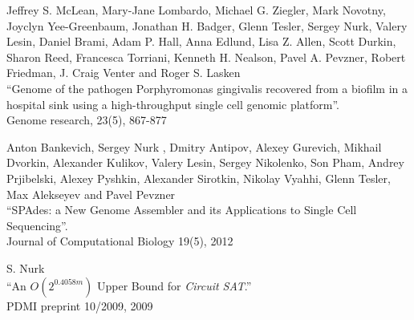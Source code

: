 \begin{innerlist}
\blankline

\item Jeffrey S. McLean, Mary-Jane Lombardo, Michael G. Ziegler, Mark Novotny, Joyclyn Yee-Greenbaum, Jonathan H. Badger, Glenn Tesler, Sergey Nurk, Valery Lesin, Daniel Brami, Adam P. Hall, Anna Edlund, Lisa Z. Allen, Scott Durkin, Sharon Reed, Francesca Torriani, Kenneth H. Nealson, Pavel A. Pevzner, Robert Friedman, J. Craig Venter and Roger S. Lasken \\
``Genome of the pathogen Porphyromonas gingivalis recovered from a biofilm in a hospital sink using a high-throughput single cell genomic platform''. \\
Genome research, 23(5), 867-877

\blankline

\item Anton Bankevich, Sergey Nurk %
, Dmitry Antipov, Alexey Gurevich, Mikhail Dvorkin, Alexander Kulikov, Valery Lesin, Sergey Nikolenko, Son Pham, Andrey Prjibelski, Alexey Pyshkin, Alexander Sirotkin, Nikolay Vyahhi, Glenn Tesler, Max Alekseyev and Pavel Pevzner\\
``SPAdes: a New Genome Assembler and its Applications to Single Cell Sequencing''.\\
Journal of Computational Biology 19(5), 2012

\blankline

\item S. Nurk\\
``An $O(2^{0.4058m})$ Upper Bound for \textit{Circuit SAT}.''\\
PDMI preprint 10/2009, 2009
\end{innerlist}

